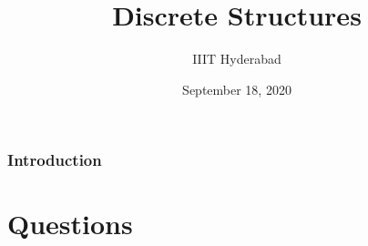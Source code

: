 \documentclass[xcolor=svgnames]{beamer}
\title[Discrete Structures]{Discrete Structures} %
\author{IIIT Hyderabad} %
\institute[] %
{
Monsoon 2020 \\ %
\medskip
\textit{Tutorial 1 Solutions} %
}
\date{September 18, 2020} %
\begin{document}
\begin{frame}
\titlepage %
\end{frame}

\begin{frame}
\frametitle{Introduction} %
\tableofcontents %
\end{frame}


\section{Questions}


\end{document}
